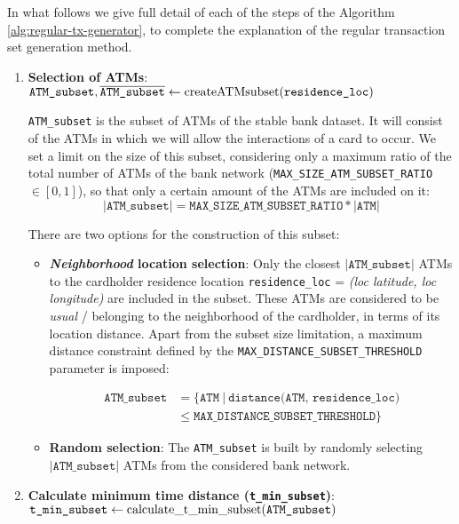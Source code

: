 In what follows we give full detail of each of the steps of the Algorithm \ref{alg:regular-tx-generator}, to complete the explanation of the regular transaction set generation method.

\begin{enumerate}
    \item \textbf{Selection of ATMs}:
    {\footnotesize \textcolor{teal}{$\texttt{ATM\_subset}, \overline{\texttt{ATM\_subset}} \gets \text{createATMsubset(\texttt{residence\_loc})}$}}

    \texttt{ATM\_subset} is the subset of ATMs of the stable bank dataset. It will consist of the ATMs in which we will allow the interactions of a card to occur. We set a limit on the size of this subset, considering only a maximum ratio of the total number of ATMs of the bank network (\texttt{MAX\_SIZE\_ATM\_SUBSET\_RATIO} $\in [0,1]$), so that only a certain amount of the ATMs are included on it: 
    $$|\texttt{ATM\_subset}| = \texttt{MAX\_SIZE\_ATM\_SUBSET\_RATIO} * |\texttt{ATM}|$$ 

    There are two options for the construction of this subset:
    \begin{itemize}
        \item \textbf{\emph{Neighborhood} location selection}: Only the closest $|\texttt{ATM\_subset}|$ ATMs to the cardholder residence location \texttt{residence\_loc} = \emph{(loc latitude, loc longitude)} are included in the subset. These ATMs are considered to be \textit{usual} / belonging to the neighborhood of the cardholder, in terms of its location distance. Apart from the subset size limitation, a maximum distance constraint defined by the
        \texttt{MAX\_DISTANCE\_SUBSET\_THRESHOLD} parameter is imposed:
        
        \begin{align*}
        \texttt{ATM\_subset} &= \{\texttt{ATM}\ |\ \texttt{distance(ATM, residence\_loc)} \\
        &\leq \texttt{MAX\_DISTANCE\_SUBSET\_THRESHOLD}\}
        \end{align*}
    
        \item \textbf{Random selection}: The \texttt{ATM\_subset} is built by randomly selecting $|\texttt{ATM\_subset}|$ ATMs from the considered bank network.
    \end{itemize}

    \item \textbf{Calculate minimum time distance (\texttt{t\_min\_subset})}:\\
    {\footnotesize\textcolor{teal}{$\texttt{t\_min\_subset} \gets \text{calculate\_t\_min\_subset(\texttt{ATM\_subset})}$}}


\end{enumerate}
